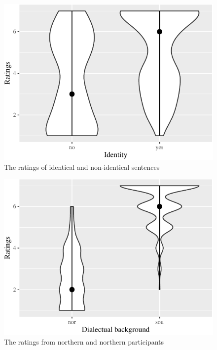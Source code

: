 \documentclass[
  english,
  man,floatsintext]{apa6}
\begin{document}
\begin{figure}

{\centering \includegraphics{manuscript_files/figure-latex/plot12-1} 

}

\caption{The ratings of identical and non-identical sentences}\label{fig:plot12}
\end{figure}
\begin{figure}

{\centering \includegraphics{manuscript_files/figure-latex/plot13-1} 

}

\caption{The ratings from northern and northern participants}\label{fig:plot13}
\end{figure}
\end{document}
